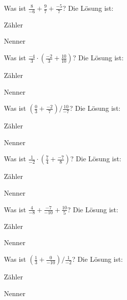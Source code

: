 \documentclass{ximera}
\begin{document}
\begin{shuffle}
\begin{question}
Was ist $\frac{8}{-6}+\frac{9}{7}+\frac{-5}{7}$?
Die Lösung ist:
\begin{solution}
Zähler 
\end{solution}
\begin{solution}
Nenner 
\end{solution}
\end{question}


\begin{question}
Was ist $\frac{-4}{3}\cdot(\frac{-2}{3}+\frac{10}{10})$?
Die Lösung ist:
\begin{solution}
Zähler 
\end{solution}
\begin{solution}
Nenner 
\end{solution}
\end{question}


\begin{question}
Was ist $(\frac{0}{3}+\frac{-2}{7})/\frac{10}{-7}$?
Die Lösung ist:
\begin{solution}
Zähler 
\end{solution}
\begin{solution}
Nenner 
\end{solution}
\end{question}


\begin{question}
Was ist $\frac{1}{-2}\cdot(\frac{7}{4}+\frac{-7}{8})$?
Die Lösung ist:
\begin{solution}
Zähler 
\end{solution}
\begin{solution}
Nenner 
\end{solution}
\end{question}


\begin{question}
Was ist $\frac{4}{-8}+\frac{-7}{-10}+\frac{10}{5}$?
Die Lösung ist:
\begin{solution}
Zähler 
\end{solution}
\begin{solution}
Nenner 
\end{solution}
\end{question}


\begin{question}
Was ist $(\frac{1}{3}+\frac{0}{-10})/\frac{1}{-2}$?
Die Lösung ist:
\begin{solution}
Zähler 
\end{solution}
\begin{solution}
Nenner 
\end{solution}
\end{question}



\end{shuffle}
\end{document}
